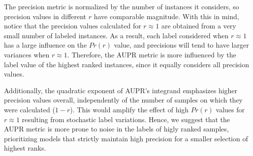 
The precision metric is normalized by the number of instances it considers, so precision values in different $r$ have comparable magnitude.
%
With this in mind, notice that the precision values calculated for $r\approx 1$ are obtained from a very small number of labeled instances. As a result, each label considered when $r \approx 1$ has a large influence on the $Pr(r)$ value, and precisions will tend to have larger variances when $r\approx 1$.
%
Therefore, the AUPR metric is more influenced by the label value of the highest ranked instances, since it equally considers all precision values.

Additionally, the quadratic exponent of AUPR's integrand emphasizes higher precision values overall, independently of the number of samples on which they were calculated ($1 - r$). This would amplify the effect of high $Pr(r)$ values for $r \approx 1$ resulting from stochastic label variations.
Hence, we suggest that the AUPR metric is more prone to noise in the labels of higly ranked samples, prioritizing models that strictly maintain high precision for a smaller selection of highest ranks.


